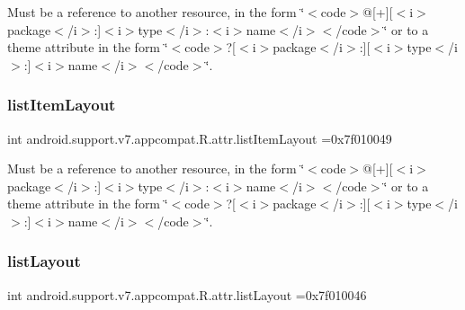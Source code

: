 Must be a reference to another resource, in the form \char`\"{}$<$code$>$@\mbox{[}+\mbox{]}\mbox{[}$<$i$>$package$<$/i$>$\+:\mbox{]}$<$i$>$type$<$/i$>$\+:$<$i$>$name$<$/i$>$$<$/code$>$\char`\"{} or to a theme attribute in the form \char`\"{}$<$code$>$?\mbox{[}$<$i$>$package$<$/i$>$\+:\mbox{]}\mbox{[}$<$i$>$type$<$/i$>$\+:\mbox{]}$<$i$>$name$<$/i$>$$<$/code$>$\char`\"{}. \mbox{\label{classandroid_1_1support_1_1v7_1_1appcompat_1_1R_1_1attr_aac806ba62d695aec18eee470353341ac}} 
\subsubsection{\texorpdfstring{list\+Item\+Layout}{listItemLayout}}
{\footnotesize\ttfamily int android.\+support.\+v7.\+appcompat.\+R.\+attr.\+list\+Item\+Layout =0x7f010049\hspace{0.3cm}{\ttfamily [static]}}

Must be a reference to another resource, in the form \char`\"{}$<$code$>$@\mbox{[}+\mbox{]}\mbox{[}$<$i$>$package$<$/i$>$\+:\mbox{]}$<$i$>$type$<$/i$>$\+:$<$i$>$name$<$/i$>$$<$/code$>$\char`\"{} or to a theme attribute in the form \char`\"{}$<$code$>$?\mbox{[}$<$i$>$package$<$/i$>$\+:\mbox{]}\mbox{[}$<$i$>$type$<$/i$>$\+:\mbox{]}$<$i$>$name$<$/i$>$$<$/code$>$\char`\"{}. \mbox{\label{classandroid_1_1support_1_1v7_1_1appcompat_1_1R_1_1attr_a39adb57b26d0e68eee700d832de9946a}} 
\subsubsection{\texorpdfstring{list\+Layout}{listLayout}}
{\footnotesize\ttfamily int android.\+support.\+v7.\+appcompat.\+R.\+attr.\+list\+Layout =0x7f010046\hspace{0.3cm}{\ttfamily [static]}}

